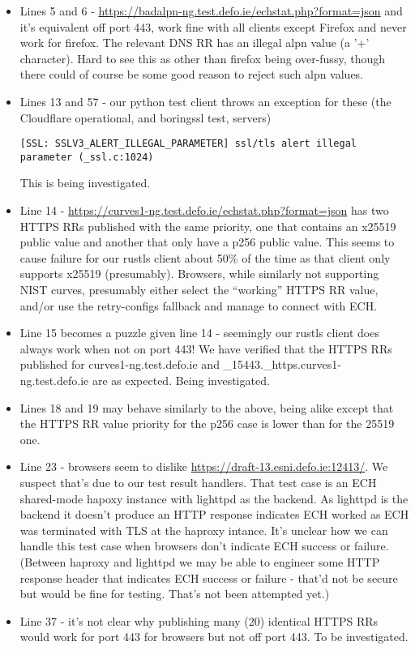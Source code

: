 \begin{itemize}
\item Lines 5 and 6 - \url{https://badalpn-ng.test.defo.ie/echstat.php?format=json} and
    it's equivalent off port 443, work fine with all clients except Firefox and never work
    for firefox. The relevant DNS RR has an illegal alpn value (a '+' character). Hard to
    see this as other than firefox being over-fussy, though there could of course be some
    good reason to reject such alpn values.
\item Lines 13 and 57 - our python test client throws an exception for these (the
    Cloudflare operational, and boringssl test, servers)
        \begin{verbatim}
[SSL: SSLV3_ALERT_ILLEGAL_PARAMETER] ssl/tls alert illegal parameter (_ssl.c:1024)
        \end{verbatim}
        This is being investigated.
    \item Line 14 - \url{https://curves1-ng.test.defo.ie/echstat.php?format=json}
        has two HTTPS RRs published with the same priority, one that contains an
        x25519 public value and another that only have a p256 public value. This
        seems to cause failure for our rustls client about 50\% of the time as
        that client only supports x25519 (presumably). Browsers, while similarly
        not supporting NIST curves, presumably either select the ``working'' HTTPS 
        RR value, and/or use the retry-configs fallback and manage to connect with ECH.
    \item Line 15 becomes a puzzle given line 14 - seemingly our rustls client does
        always work when not on port 443! We have verified that the HTTPS RRs published
        for curves1-ng.test.defo.ie and \_15443.\_https.curves1-ng.test.defo.ie are
        as expected. Being investigated.
    \item Lines 18 and 19 may behave similarly to the above, being alike except that
        the HTTPS RR value priority for the p256 case is lower than for the 25519
        one.
    \item Line 23 - browsers seem to dislike \url{https://draft-13.esni.defo.ie:12413/}.
        We suspect that's due to our test result handlers. That test case is an 
        ECH shared-mode hapoxy instance with lighttpd as the backend. As lighttpd
        is the backend it doesn't produce an HTTP response indicates ECH worked as
        ECH was terminated with TLS at the haproxy intance. It's unclear how we
        can handle this test case when browsers don't indicate ECH success or
        failure. (Between haproxy and lighttpd we may be able to engineer some
        HTTP response header that indicates ECH success or failure - that'd not
        be secure but would be fine for testing. That's not been attempted yet.)
    \item Line 37 - it's not clear why publishing many (20) identical HTTPS RRs would work
        for port 443 for browsers but not off port 443. To be investigated.

\end{itemize}

